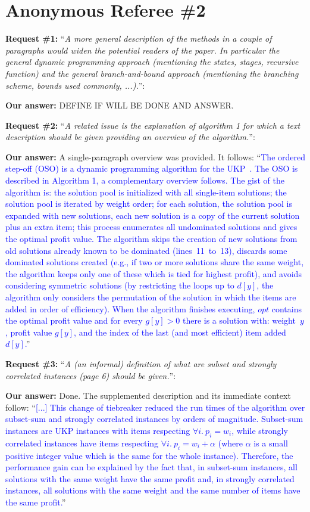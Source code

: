 \documentclass{elsarticle}
\begin{document}
\section{Anonymous Referee \#2}

\textbf{Request \#1:} ``\textit{A more general description of the methods in a couple of paragraphs would widen the potential readers of the paper. In particular the general dynamic programming approach (mentioning the states, stages, recursive function) and the general branch-and-bound approach (mentioning the branching scheme, bounds used commonly, ...).}'': 

\textbf{Our answer:} DEFINE IF WILL BE DONE AND ANSWER.
\medskip

\textbf{Request \#2:} ``\textit{A related issue is the explanation of algorithm 1 for which a text description should be given providing an overview of the algorithm.}'': 

\textbf{Our answer:} A single-paragraph overview was provided. It follows: ``\textcolor{blue}{The ordered step-off (OSO) is a dynamic programming algorithm for the UKP~\citep{gg-66}.
The OSO is described in Algorithm 1, a complementary overview follows.
The gist of the algorithm is: the solution pool is initialized with all single-item solutions; the solution pool is iterated by weight order; for each solution, the solution pool is expanded with new solutions, each new solution is a copy of the current solution plus an extra item; this process enumerates all undominated solutions and gives the optimal profit value.
The algorithm skips the creation of new solutions from old solutions already known to be dominated (lines~11~to~13), discards some dominated solutions created (e.g., if two or more solutions share the same weight, the algorithm keeps only one of these which is tied for highest profit), and avoids considering symmetric solutions (by restricting the loops up to \(d[y]\), the algorithm only considers the permutation of the solution in which the items are added in order of efficiency).
When the algorithm finishes executing, \(opt\) contains the optimal profit value and for every \(g[y] > 0\) there is a solution with: weight~\(y\), profit value \(g[y]\), and the index of the last (and most efficient) item added~\(d[y]\).}''
\medskip

\textbf{Request \#3:} ``\textit{A (an informal) definition of what are subset and strongly correlated instances (page 6) should be given.}'': 

\textbf{Our answer:} Done. The supplemented description and its immediate context follow: ``\textcolor{blue}{[...] This change of tiebreaker reduced the run times of the algorithm over subset-sum and strongly correlated instances by orders of magnitude. Subset-sum instances are UKP instances with items respecting \(\forall i.~p_i = w_i\), while strongly correlated instances have items respecting \(\forall i.~p_i = w_i + \alpha\) (where \(\alpha\) is a small positive integer value which is the same for the whole instance). Therefore, the performance gain can be explained by the fact that, in subset-sum instances, all solutions with the same weight have the same profit and, in strongly correlated instances, all solutions with the same weight and the same number of items have the same profit.}''
\medskip
\end{document}
